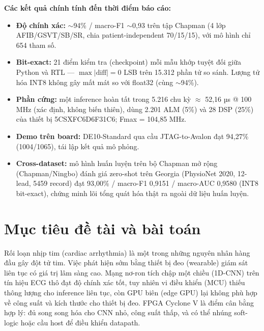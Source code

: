 \documentclass[12pt,a4paper]{article}
\begin{document}
\textbf{Các kết quả chính tính đến thời điểm báo cáo:}
\begin{itemize}
  \item \textbf{Độ chính xác:} $\sim$94\% / macro-F1 $\sim$0,93 trên tập Chapman (4 lớp
        AFIB/GSVT/SB/SR, chia patient-independent 70/15/15), với mô hình chỉ 654 tham số.
  \item \textbf{Bit-exact:} 21 điểm kiểm tra (checkpoint) mỗi mẫu khớp tuyệt đối giữa Python
        và RTL --- $\max|\text{diff}| = 0$ LSB trên 15.312 phần tử so sánh. Lượng tử hóa INT8
        không gây mất mát so với float32 (cùng $\sim$94\%).
  \item \textbf{Phần cứng:} một inference hoàn tất trong 5.216 chu kỳ $\approx$ 52,16 µs @
        100 MHz (xác định, không biến thiên), dùng 2.201 ALM (5\%) và 28 DSP (25\%) của thiết
        bị 5CSXFC6D6F31C6; Fmax = 104,85 MHz.
  \item \textbf{Demo trên board:} DE10-Standard qua cầu JTAG-to-Avalon đạt 94,27\%
        (1004/1065), tái lập kết quả mô phỏng.
  \item \textbf{Cross-dataset:} mô hình huấn luyện trên bộ Chapman mở rộng (Chapman/Ningbo)
        đánh giá zero-shot trên Georgia (PhysioNet 2020, 12-lead, 5459 record) đạt 93,00\% /
        macro-F1 0,9151 / macro-AUC 0,9580 (INT8 bit-exact), chứng minh lõi tổng quát hóa thật
        ra ngoài dữ liệu huấn luyện.
\end{itemize}

\section{Mục tiêu đề tài và bài toán}

Rối loạn nhịp tim (cardiac arrhythmia) là một trong những nguyên nhân hàng đầu gây đột tử
tim. Việc phát hiện sớm bằng thiết bị đeo (wearable) giám sát liên tục có giá trị lâm sàng
cao. Mạng nơ-ron tích chập một chiều (1D-CNN) trên tín hiệu ECG thô đạt độ chính xác tốt,
tuy nhiên vi điều khiển (MCU) thiếu thông lượng cho inference liên tục, còn GPU biên (edge
GPU) lại không phù hợp về công suất và kích thước cho thiết bị đeo. FPGA Cyclone V là điểm
cân bằng hợp lý: đủ song song hóa cho CNN nhỏ, công suất thấp, và có thể nhúng soft-logic
hoặc cầu host để điều khiển datapath.
\end{document}
